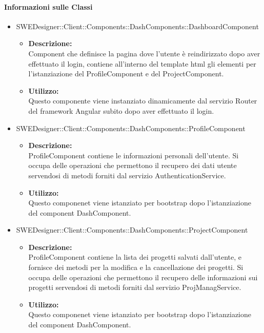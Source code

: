 		\paragraph{Informazioni sulle Classi}
		\begin{itemize}
			\item SWEDesigner::Client::Components::DashComponents::DashboardComponent
			\begin{itemize}
				\item \textbf{Descrizione: }\\
				Component che definisce la pagina dove l'utente è reindirizzato dopo aver
				effettuato il login, contiene all'interno del template html gli elementi
				per l'istanziazione del ProfileComponent e del ProjectComponent.
				\item \textbf{Utilizzo: }\\
				Questo componente viene instanziato dinamicamente dal servizio Router del
				framework Angular subito dopo aver effettuato il login.
			\end{itemize}
			\item SWEDesigner::Client::Components::DashComponents::ProfileComponent
			\begin{itemize}
				\item \textbf{Descrizione: }\\
				ProfileComponent contiene le informazioni personali dell'utente. Si occupa
				delle operazioni che permettono il recupero dei dati utente servendosi di
				metodi forniti dal servizio AuthenticationService.
				\item \textbf{Utilizzo: }\\
				Questo componenet viene istanziato per bootstrap dopo l'istanziazione
				del component DashComponent.
			\end{itemize}
			\item SWEDesigner::Client::Components::DashComponents::ProjectComponent
			\begin{itemize}
				\item \textbf{Descrizione: }\\
				ProfileComponent contiene la lista dei progetti salvati dall'utente, e
				fornisce dei metodi per la modifica e la cancellazione dei progetti. Si
				occupa delle operazioni che permettono il recupero delle informazioni sui
				progetti servendosi di metodi forniti dal servizio ProjManagService.
				\item \textbf{Utilizzo: }\\
				Questo componenet viene istanziato per bootstrap dopo l'istanziazione
				del component DashComponent.
			\end{itemize}
		\end{itemize}

